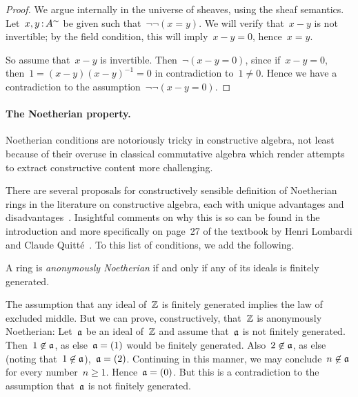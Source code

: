 \documentclass{ws-rv9x6}
\begin{document}
{\begin{proof}We argue internally in the universe of sheaves, using the sheaf
semantics. Let~$x,y \,{:}\, A^\sim$ be given such
that~$\neg\neg(x = y)$. We will verify that~$x - y$ is not invertible; by the
field condition, this will imply~$x - y = 0$, hence~$x = y$.

So assume that~$x - y$ is invertible. Then~$\neg(x - y = 0)$, since if~$x - y =
0$, then~$1 = (x-y) (x-y)^{-1} = 0$ in contradiction to~$1 \neq 0$. Hence we have a
contradiction to the assumption~$\neg\neg(x-y=0)$.\end{proof}


\paragraph{The Noetherian property.}

Noetherian conditions are notoriously tricky in constructive algebra, not
least because of their overuse in classical commutative algebra which render
attempts to extract constructive content more challenging.

There are several proposals for constructively sensible definition of
Noetherian rings in the literature on constructive algebra, each with unique
advantages and
disadvantages~\cite{richman:noetherian,mines-richman-ruitenburg:constructive-algebra,perdry:noetherian,perdry:lazy,perdry-schuster:noetherian,tennenbaum:hilbert}.
Insightful comments on why this is so can be found in the introduction and more
specifically on page~27 of the textbook by Henri Lombardi and Claude
Quitté~\cite{lombardi-quitte:constructive-algebra}. To this list of conditions,
we add the following.

\begin{definition}
\label{defn:anonymously-noetherian}
A ring is \emph{anonymously Noetherian} if and only if any of its ideals is
\notnot finitely generated.
\end{definition}

\begin{example}\label{ex:z-noeth}The assumption that any ideal of~$\mathbb{Z}$ is finitely generated implies
the law of excluded middle. But we can prove, constructively, that~$\mathbb{Z}$ is
anonymously Noetherian: Let~$\mathfrak{a}$ be an ideal of~$\mathbb{Z}$ and assume that~$\mathfrak{a}$
is not finitely generated. Then~$1 \not\in \mathfrak{a}$, as else~$\mathfrak{a} = (1)$ would be
finitely generated. Also~$2 \not\in \mathfrak{a}$, as else (noting
that~$1\not\in\mathfrak{a}$),~$\mathfrak{a} = (2)$. Continuing in this manner, we may
conclude~$n \not\in \mathfrak{a}$ for every number~$n \geq 1$. Hence~$\mathfrak{a} = (0)$. But
this is a contradiction to the assumption that~$\mathfrak{a}$ is not finitely
generated.
\end{example}

}
\end{document}
